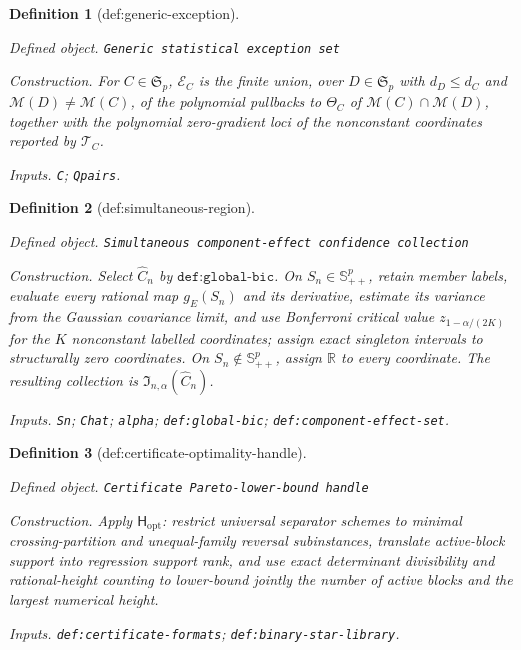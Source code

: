 \documentclass{article}
\newtheorem{definition}{Definition}
\begin{document}
\begin{definition}[def:generic-exception]\label{def:generic-exception}
\par\smallskip\noindent\emph{Defined object.} \texttt{Generic statistical exception set}
\par\smallskip\noindent\emph{Construction.} For \(C\in\mathfrak S_p\), \(\mathcal E_C\) is the finite union, over \(D\in\mathfrak S_p\) with \(d_D\leq d_C\) and \(\mathcal M(D)\neq\mathcal M(C)\), of the polynomial pullbacks to \(\Theta_C\) of \(\mathcal M(C)\cap\mathcal M(D)\), together with the polynomial zero-gradient loci of the nonconstant coordinates reported by \(\mathcal T_C\).
\par\smallskip\noindent\emph{Inputs.} \texttt{C}; \texttt{Qpairs}.
\end{definition}

\begin{definition}[def:simultaneous-region]\label{def:simultaneous-region}
\par\smallskip\noindent\emph{Defined object.} \texttt{Simultaneous component-\allowbreak{}effect confidence collection}
\par\smallskip\noindent\emph{Construction.} Select \(\widehat C_n\) by \(\texttt{def:global-bic}\). On \(S_n\in\mathbb S^p_{++}\), retain member labels, evaluate every rational map \(g_E(S_n)\) and its derivative, estimate its variance from the Gaussian covariance limit, and use Bonferroni critical value \(z_{1-\alpha/(2K)}\) for the \(K\) nonconstant labelled coordinates; assign exact singleton intervals to structurally zero coordinates. On \(S_n\notin\mathbb S^p_{++}\), assign \(\mathbb R\) to every coordinate. The resulting collection is \(\mathfrak I_{n,\alpha}(\widehat C_n)\).
\par\smallskip\noindent\emph{Inputs.} \texttt{Sn}; \texttt{Chat}; \texttt{alpha}; \texttt{def:\allowbreak{}global-\allowbreak{}bic}; \texttt{def:\allowbreak{}component-\allowbreak{}effect-\allowbreak{}set}.
\end{definition}

\begin{definition}[def:certificate-optimality-handle]\label{def:certificate-optimality-handle}
\par\smallskip\noindent\emph{Defined object.} \texttt{Certificate Pareto-\allowbreak{}lower-\allowbreak{}bound handle}
\par\smallskip\noindent\emph{Construction.} Apply \(\mathsf H_{\mathrm{opt}}\): restrict universal separator schemes to minimal crossing-partition and unequal-family reversal subinstances, translate active-block support into regression support rank, and use exact determinant divisibility and rational-height counting to lower-bound jointly the number of active blocks and the largest numerical height.
\par\smallskip\noindent\emph{Inputs.} \texttt{def:\allowbreak{}certificate-\allowbreak{}formats}; \texttt{def:\allowbreak{}binary-\allowbreak{}star-\allowbreak{}library}.
\end{definition}
\end{document}
